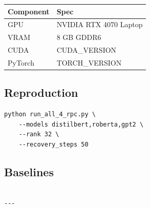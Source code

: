 \begin{table}[H]
\centering
\small
\begin{tabular}{ll}
\toprule
\textbf{Component} & \textbf{Spec} \\
\midrule
GPU & NVIDIA RTX 4070 Laptop \\
VRAM & 8 GB GDDR6 \\
CUDA & {{CUDA\_VERSION}} \\
PyTorch & {{TORCH\_VERSION}} \\
\bottomrule
\end{tabular}
\end{table}

\subsection{Reproduction}

\begin{lstlisting}
python run_all_4_rpc.py \
    --models distilbert,roberta,gpt2 \
    --rank 32 \
    --recovery_steps 50
\end{lstlisting}

\subsection{Baselines}

\begin{lstlisting}

---
\end{lstlisting}